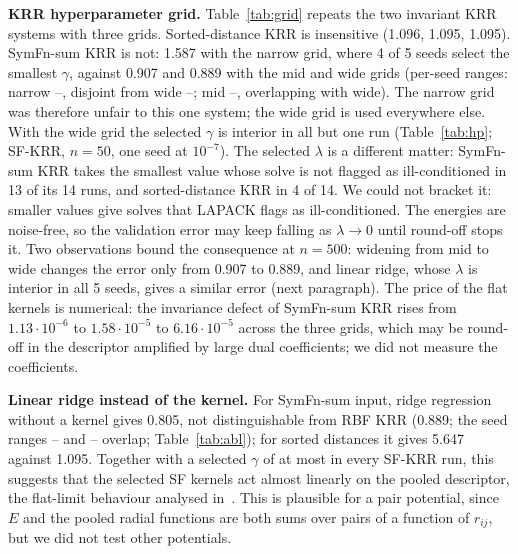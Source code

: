 \textbf{KRR hyperparameter grid.} Table~\ref{tab:grid} repeats the two invariant KRR systems with three grids. Sorted-distance KRR is insensitive (1.096, 1.095, 1.095). SymFn-sum KRR is not: 1.587 with the narrow grid, where 4 of 5 seeds select the smallest $\gamma$, against 0.907 and 0.889 with the mid and wide grids (per-seed ranges: narrow --, disjoint from wide --; mid --, overlapping with wide). The narrow grid was therefore unfair to this one system; the wide grid is used everywhere else. With the wide grid the selected $\gamma$ is interior in all but one run (Table~\ref{tab:hp}; SF-KRR, $n{=}50$, one seed at $10^{-7}$). The selected $\lambda$ is a different matter: SymFn-sum KRR takes the smallest value whose solve is not flagged as ill-conditioned in 13 of its 14 runs, and sorted-distance KRR in 4 of 14. We could not bracket it: smaller values give solves that LAPACK flags as ill-conditioned. The energies are noise-free, so the validation error may keep falling as $\lambda\to0$ until round-off stops it. Two observations bound the consequence at $n{=}500$: widening from mid to wide changes the error only from 0.907 to 0.889, and linear ridge, whose $\lambda$ is interior in all 5 seeds, gives a similar error (next paragraph). The price of the flat kernels is numerical: the invariance defect of SymFn-sum KRR rises from $1.13\cdot10^{-6}$ to $1.58\cdot10^{-5}$ to $6.16\cdot10^{-5}$ across the three grids, which may be round-off in the descriptor amplified by large dual coefficients; we did not measure the coefficients.

\textbf{Linear ridge instead of the kernel.} For SymFn-sum input, ridge regression without a kernel gives 0.805, not distinguishable from RBF KRR (0.889; the seed ranges -- and -- overlap; Table~\ref{tab:abl}); for sorted distances it gives 5.647 against 1.095. Together with a selected $\gamma$ of at most  in every SF-KRR run, this suggests that the selected SF kernels act almost linearly on the pooled descriptor, the flat-limit behaviour analysed in~\cite{barthelm2022gaussian}. This is plausible for a pair potential, since $E$ and the pooled radial functions are both sums over pairs of a function of $r_{ij}$, but we did not test other potentials.

